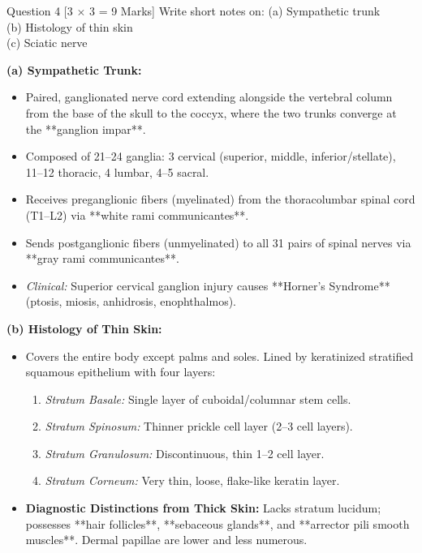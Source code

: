 \documentclass[11pt,a4paper]{article}
\begin{document}
\begin{qbox}{Question 4 [3 $\times$ 3 = 9 Marks]}
Write short notes on:
(a) Sympathetic trunk \\
(b) Histology of thin skin \\
(c) Sciatic nerve
\end{qbox}

\begin{ansbox}
\textbf{(a) Sympathetic Trunk:}
\begin{itemize}[leftmargin=*]
    \item Paired, ganglionated nerve cord extending alongside the vertebral column from the base of the skull to the coccyx, where the two trunks converge at the **ganglion impar**.
    \item Composed of 21--24 ganglia: 3 cervical (superior, middle, inferior/stellate), 11--12 thoracic, 4 lumbar, 4--5 sacral.
    \item Receives preganglionic fibers (myelinated) from the thoracolumbar spinal cord (T1--L2) via **white rami communicantes**.
    \item Sends postganglionic fibers (unmyelinated) to all 31 pairs of spinal nerves via **gray rami communicantes**.
    \item \textit{Clinical:} Superior cervical ganglion injury causes **Horner's Syndrome** (ptosis, miosis, anhidrosis, enophthalmos).
\end{itemize}

\textbf{(b) Histology of Thin Skin:}
\begin{itemize}[leftmargin=*]
    \item Covers the entire body except palms and soles. Lined by keratinized stratified squamous epithelium with four layers:
    \begin{enumerate}
        \item \textit{Stratum Basale:} Single layer of cuboidal/columnar stem cells.
        \item \textit{Stratum Spinosum:} Thinner prickle cell layer (2--3 cell layers).
        \item \textit{Stratum Granulosum:} Discontinuous, thin 1--2 cell layer.
        \item \textit{Stratum Corneum:} Very thin, loose, flake-like keratin layer.
    \end{enumerate}
    \item \textbf{Diagnostic Distinctions from Thick Skin:} Lacks stratum lucidum; possesses **hair follicles**, **sebaceous glands**, and **arrector pili smooth muscles**. Dermal papillae are lower and less numerous.
\end{itemize}


\end{ansbox}
\end{document}
